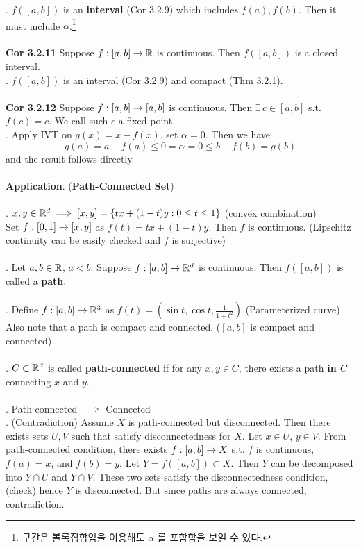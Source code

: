 \pf. $f([a, b])$ is an \textbf{interval} (Cor 3.2.9) which includes $f(a), f(b)$. Then it must include $\alpha$.\footnote{구간은 볼록집합임을 이용해도 $\alpha$ 를 포함함을 보일 수 있다.}\\
\\
\textbf{Cor 3.2.11} Suppose $f:[a, b] \rightarrow \mathbb{R}$ is continuous. Then $f([a, b])$ is a closed interval.\\
\pf. $f([a, b])$ is an interval (Cor 3.2.9) and compact (Thm 3.2.1).\\
\\
\textbf{Cor 3.2.12} Suppose $f:[a, b]\rightarrow [a, b]$ is continuous. Then $\exists\, c\in [a, b]$ s.t. $f(c)=c$. We call such $c$ a fixed point.\\
\pf. Apply IVT on $g(x) = x - f(x)$, set $\alpha = 0$. Then we have $$g(a) = a - f(a) \leq 0 = \alpha = 0 \leq b - f(b) = g(b)$$ and the result follows directly.\\
\\
\textbf{Application}. (\textbf{Path-Connected Set})\\
\\
\rmk. $x, y\in \mathbb{R}^d \implies [x, y] = \{tx + (1-t)y :0\leq t\leq 1 \}$ (convex combination)\\
Set $f:[0, 1]\rightarrow [x, y]$ as $f(t) = tx + (1-t)y$. Then $f$ is continuous. (Lipschitz continuity can be easily checked and $f$ is surjective)\\
\\
. Let $a, b\in \mathbb{R}$, $a<b$. Suppose $f:[a, b]\rightarrow \mathbb{R}^d$ is continuous. Then $f([a, b])$ is called a \textbf{path}.\\
\\
\rmk. Define $f:[a, b] \rightarrow \mathbb{R}^3$ as $f(t) = (\sin t, \cos t, \frac{1}{1+t^2})$ (Parameterized curve)\\
Also note that a path is compact and connected. ($[a, b]$ is compact and connected)\\
\\
. $C\subset \mathbb{R}^d$ is called \textbf{path-connected} if for any $x, y\in C$, there exists a path\textbf{ in $C$} connecting $x$ and $y$.\\
\\
\thm. Path-connected $\implies$ Connected\\
\pf. (Contradiction) Assume $X$ is path-connected but disconnected. Then there exists sets $U, V$ such that satisfy disconnectedness for $X$. Let $x\in U$, $y\in V$. From path-connected condition, there exists $f:[a, b]\rightarrow X$ s.t. $f$ is continuous, $f(a) = x$, and $f(b) = y$. Let $Y = f([a, b]) \subset X$. Then $Y$ can be decomposed into $Y\cap U$ and $Y\cap V$. These two sets satisfy the disconnectedness condition, (check) hence $Y$ is disconnected. But since paths are always connected, contradiction.\\
